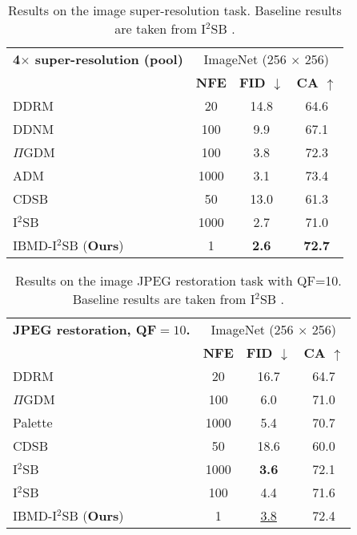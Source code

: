 \begin{table}[t]
\centering
\caption{Results on the image super-resolution task. Baseline results are taken from I$^2$SB \citep{liu20232}.}
\label{tab:sr-pool}
\begin{tabular}{lccc}
\toprule
\textbf{4$\times$ super-resolution (pool)} & \multicolumn{3}{c}{ImageNet (256 $\times$ 256)} \\ \cmidrule(lr){2-4} 
 & \textbf{NFE} & \textbf{FID $\downarrow$} & \textbf{CA $\uparrow$} \\ \midrule
DDRM \cite{kawar2022denoising} & 20 & 14.8 & 64.6 \\
DDNM \citep{wang2023zeroshot} & 100 & 9.9 & 67.1 \\
$\Pi$GDM \cite{song2023pseudoinverse} & 100 & 3.8 & 72.3 \\
ADM \citep{dhariwal2021diffusion} & 1000 & 3.1 & 73.4 \\
CDSB \citep{shi2022conditional} & 50 & 13.0 & 61.3 \\
I$^2$SB \cite{liu20232} & 1000 & 2.7 & 71.0 \\ 
\midrule
IBMD-I$^2$SB (\textbf{Ours}) & 1 & \textbf{2.6} & \textbf{72.7} \\ 
\bottomrule
\end{tabular}
\vspace{-6mm}
\end{table}

\begin{table}[t]
\centering
\caption{Results on the image JPEG restoration task with QF=10. Baseline results are taken from I$^2$SB \citep{liu20232}.}
\label{tab:jpeg-10}
\begin{tabular}{lccc}
\toprule
\textbf{JPEG restoration, QF$=10$.} & \multicolumn{3}{c}{ImageNet (256 $\times$ 256)} \\ \cmidrule(lr){2-4} 
 & \textbf{NFE} & \textbf{FID $\downarrow$} & \textbf{CA $\uparrow$} \\ \midrule
DDRM \cite{kawar2022denoising} & 20 & 16.7 & 64.7 \\
$\Pi$GDM \cite{song2023pseudoinverse} & 100 & 6.0 & 71.0 \\
Palette \citep{saharia2022palette} & 1000 & 5.4 & 70.7 \\
CDSB \citep{shi2022conditional} & 50 & 18.6 & 60.0 \\
I$^2$SB \cite{liu20232} & 1000 & \textbf{3.6} & 72.1 \\ 
I$^2$SB \cite{liu20232} & 100 & 4.4 & 71.6 \\ 
\midrule
IBMD-I$^2$SB (\textbf{Ours}) & 1 & \underline{3.8} & 72.4 \\ 
\bottomrule
\end{tabular}
\vspace{-6mm}
\end{table}
